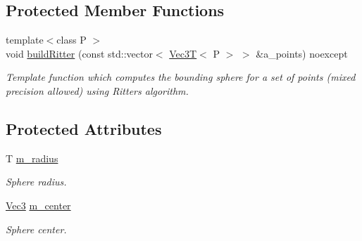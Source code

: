 \subsection*{Protected Member Functions}
\begin{DoxyCompactItemize}
\item 
\mbox{\label{classEBGeometry_1_1BoundingVolumes_1_1BoundingSphereT_a270720886cb098e072173dd25262135f}} 
{\footnotesize template$<$class P $>$ }\\void \hyperlink{classEBGeometry_1_1BoundingVolumes_1_1BoundingSphereT_a270720886cb098e072173dd25262135f}{build\+Ritter} (const std\+::vector$<$ \hyperlink{classVec3T}{Vec3T}$<$ P $>$ $>$ \&a\+\_\+points) noexcept
\begin{DoxyCompactList}\small\item\em Template function which computes the bounding sphere for a set of points (mixed precision allowed) using Ritter\textquotesingle{}s algorithm. \end{DoxyCompactList}\end{DoxyCompactItemize}
\subsection*{Protected Attributes}
\begin{DoxyCompactItemize}
\item 
\mbox{\label{classEBGeometry_1_1BoundingVolumes_1_1BoundingSphereT_a5c2f7e0aefbd91b38af1e721e9b03b8e}} 
T \hyperlink{classEBGeometry_1_1BoundingVolumes_1_1BoundingSphereT_a5c2f7e0aefbd91b38af1e721e9b03b8e}{m\+\_\+radius}
\begin{DoxyCompactList}\small\item\em Sphere radius. \end{DoxyCompactList}\item 
\mbox{\label{classEBGeometry_1_1BoundingVolumes_1_1BoundingSphereT_ac6ad34b39a09a119479c5e73cabcf6c3}} 
\hyperlink{classEBGeometry_1_1BoundingVolumes_1_1BoundingSphereT_a65cef119542a4c7c1cabb1ea36f40336}{Vec3} \hyperlink{classEBGeometry_1_1BoundingVolumes_1_1BoundingSphereT_ac6ad34b39a09a119479c5e73cabcf6c3}{m\+\_\+center}
\begin{DoxyCompactList}\small\item\em Sphere center. \end{DoxyCompactList}\end{DoxyCompactItemize}


